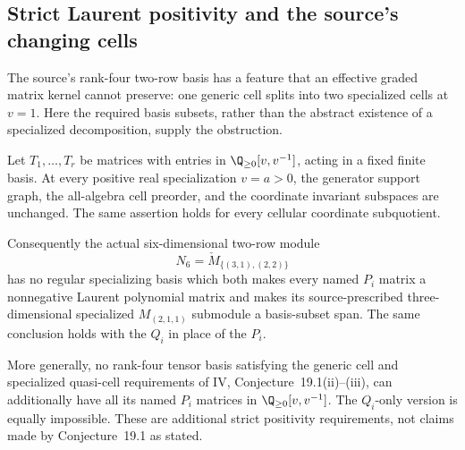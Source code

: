\subsection{Strict Laurent positivity and the source's changing cells}
The source's rank-four two-row basis has a feature that an
effective graded matrix kernel cannot preserve: one generic cell
splits into two specialized cells at \(v=1\).
Here the required basis subsets, rather than the abstract
existence of a specialized decomposition, supply the obstruction.

\begin{finding}
\label{f:cellpositivityspecialization}
Let \(T_1,\ldots,T_r\) be matrices with entries in
\(\Q_{\ge0}[v,v^{-1}]\), acting in a fixed finite basis.
At every positive real specialization \(v=a>0\), the generator
support graph, the all-algebra cell preorder, and the coordinate
invariant subspaces are unchanged. The same assertion holds for
every cellular coordinate subquotient.

Consequently the actual six-dimensional two-row module
\[
N_6=\check M_{\{(3,1),(2,2)\}}
\]
has no regular specializing basis which both makes every named
\(P_i\) matrix a nonnegative Laurent polynomial matrix and makes
its source-prescribed three-dimensional specialized
\(M_{(2,1,1)}\) submodule a basis-subset span.
The same conclusion holds with the \(Q_i\) in place of the \(P_i\).

More generally, no rank-four tensor basis satisfying the generic
cell and specialized quasi-cell requirements of IV,
Conjecture~19.1(ii)--(iii), can additionally have all its named
\(P_i\) matrices in \(\Q_{\ge0}[v,v^{-1}]\).
The \(Q_i\)-only version is equally impossible.
These are additional strict positivity requirements, not claims
made by Conjecture~19.1 as stated.
\end{finding}

